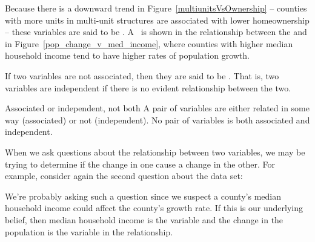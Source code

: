 Because there is a downward trend in
Figure~\ref{multiunitsVsOwnership} --
counties with more units in multi-unit structures
are associated with lower homeownership --
these variables are said to be
.
A~ is shown in the relationship
between the
and 
in Figure~\ref{pop_change_v_med_income},
where counties with higher median household income tend
to have higher rates of population growth.



If two variables are not associated,
then they are said to be .
That is, two variables are independent if there
is no evident relationship between the two.

\begin{onebox}{Associated or independent, not both}
A pair of variables are either related in some way (associated) or not (independent). No pair of variables is both associated and independent.
\end{onebox}

When we ask questions about the relationship
between two variables, we may be trying to determine
if the change in one cause a change in the other.
For example, consider again the second question about
the  data set:
\begin{quote}\em
    \popchangevmedianhhincomequestion{}
\end{quote}
We're probably asking such a question since we suspect
a county's median household income could affect the county's
growth rate.
If this is our underlying belief,
then median household income is the
variable and the change in the population is the
 variable in the
relationship.

